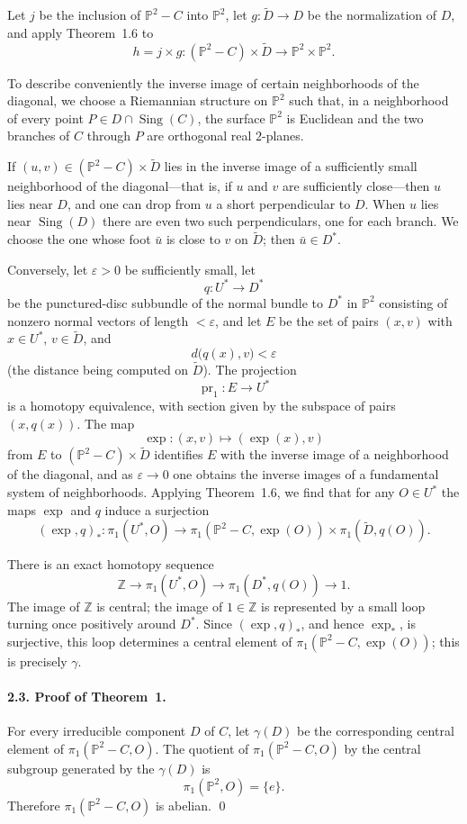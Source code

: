 \documentclass[11pt]{amsart}
\newcommand{\PP}{\mathbb{P}}
\newcommand{\ZZ}{\mathbb{Z}}
\begin{document}
Let $j$ be the inclusion of $\PP^2-C$ into $\PP^2$, let $g\colon \widetilde D\to D$ be the normalization of $D$, and apply Theorem~1.6 to
\[
h=j\times g\colon (\PP^2-C)\times \widetilde D \to \PP^2\times \PP^2.
\]

To describe conveniently the inverse image of certain neighborhoods of the diagonal, we choose a Riemannian structure on $\PP^2$ such that, in a neighborhood of every point $P\in D\cap \operatorname{Sing}(C)$, the surface $\PP^2$ is Euclidean and the two branches of $C$ through $P$ are orthogonal real $2$-planes.

If $(u,v)\in (\PP^2-C)\times \widetilde D$ lies in the inverse image of a sufficiently small neighborhood of the diagonal---that is, if $u$ and $v$ are sufficiently close---then $u$ lies near $D$, and one can drop from $u$ a short perpendicular to $D$. When $u$ lies near $\operatorname{Sing}(D)$ there are even two such perpendiculars, one for each branch. We choose the one whose foot $\bar u$ is close to $v$ on $\widetilde D$; then $\bar u\in D^*$.

Conversely, let $\varepsilon>0$ be sufficiently small, let
\[
q\colon U^*\to D^*
\]
be the punctured-disc subbundle of the normal bundle to $D^*$ in $\PP^2$ consisting of nonzero normal vectors of length $<\varepsilon$, and let $E$ be the set of pairs $(x,v)$ with $x\in U^*$, $v\in \widetilde D$, and
\[
d\bigl(q(x),v\bigr)<\varepsilon
\]
(the distance being computed on $\widetilde D$). The projection
\[
\operatorname{pr}_1\colon E\to U^*
\]
is a homotopy equivalence, with section given by the subspace of pairs $(x,q(x))$. The map
\[
\exp\colon (x,v)\mapsto (\exp(x),v)
\]
from $E$ to $(\PP^2-C)\times \widetilde D$ identifies $E$ with the inverse image of a neighborhood of the diagonal, and as $\varepsilon\to 0$ one obtains the inverse images of a fundamental system of neighborhoods. Applying Theorem~1.6, we find that for any $O\in U^*$ the maps $\exp$ and $q$ induce a surjection
\[
(\exp,q)_*\colon \pi_1(U^*,O)\to \pi_1(\PP^2-C,\exp(O))\times \pi_1(\widetilde D,q(O)).
\]

There is an exact homotopy sequence
\[
\ZZ\to \pi_1(U^*,O)\to \pi_1(D^*,q(O))\to 1.
\]
The image of $\ZZ$ is central; the image of $1\in \ZZ$ is represented by a small loop turning once positively around $D^*$. Since $(\exp,q)_*$, and hence $\exp_*$, is surjective, this loop determines a central element of $\pi_1(\PP^2-C,\exp(O))$; this is precisely $\gamma$.

\paragraph{\textbf{2.3. Proof of Theorem~1.}}
For every irreducible component $D$ of $C$, let $\gamma(D)$ be the corresponding central element of $\pi_1(\PP^2-C,O)$. The quotient of $\pi_1(\PP^2-C,O)$ by the central subgroup generated by the $\gamma(D)$ is
\[
\pi_1(\PP^2,O)=\{e\}.
\]
Therefore $\pi_1(\PP^2-C,O)$ is abelian. \qed
\end{document}
